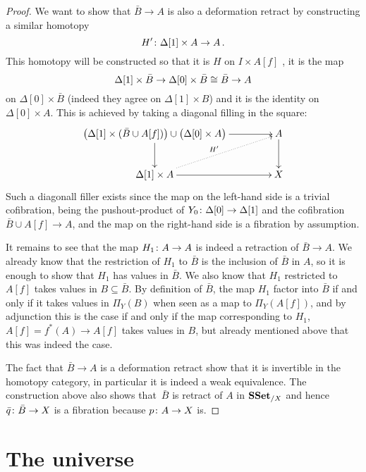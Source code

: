 \documentclass[reqno,10pt,a4paper,oneside,draft]{amsart}
\begin{document}
\begin{proof}
We want to show that $\bar{B} \rightarrow A$ is also a deformation retract by constructing a similar homotopy 
\[
H' \colon \Delta[1] \times A \rightarrow A \, .
\] 
This homotopy will be constructed so that it is $H$ on $I \times A[f]$ ,  it is the map 
\[
\Delta[1] \times \bar{B} \rightarrow \Delta[0]  \times \bar{B} \cong \bar{B} \rightarrow A
\] 
on $\Delta[0] \times \bar{B} $ (indeed they agree on $\Delta[1] \times B$) and it is the identity on $\Delta[0] \times A$.  This is achieved by taking a diagonal filling in the square:
\[
\xymatrix@C=1.5cm{
\big( \Delta[1] \times (\bar{B} \cup A[f]) \big)  \cup \big( \Delta[0] \times A \big) \ar[d] \ar[r] & A \ar[d] \\
\Delta[1] \times A \ar[r] \ar@{.>}[ur]^{H'} & X
}\]
Such a diagonall filler exists since the map on the left-hand side is a trivial cofibration, being the 
 pushout-product of $Y_0 \colon \Delta[0] \rightarrow \Delta[1]$ and the cofibration $\bar{B} \cup A[f] \rightarrow A$, and the map on the right-hand side is a fibration by assumption.

It remains to see that the map $H_{1} \colon A \rightarrow A$ is indeed a retraction of $\bar{B} \rightarrow A$. We already know that the restriction of $H_{1}$ to $\bar{B}$ is  the inclusion of $\bar{B}$ in $A$, so it is enough to show that $H_{1}$ has values in $\bar{B}$. We also know that $H_{1}$ restricted to $A[f]$ takes values in $B \subseteq \bar{B}$. By definition of $\bar{B}$, the map $H_1$ factor into $\bar{B}$ if and only if it takes values in $\Pi_Y(B)$ when seen as a map to $\Pi_Y(A[f])$, and by adjunction this is the case if and only if the map corresponding to $H_1$, $A[f]= f^*(A) \rightarrow A[f]$ takes values in $B$, but already mentioned above that this was indeed the case.

The fact that $\bar{B} \rightarrow A$ is a deformation retract show that it is invertible in the homotopy category, in particular it is indeed a weak equivalence. The construction above also shows that~$\bar{B}$ is retract of $A$ in $\mathbf{SSet}_{/X}$ and hence $\bar{q} \colon \bar{B} \rightarrow X$ is a fibration because $p \colon A \rightarrow X$ is.
\end{proof}

 

\section{The universe}
\end{document}
